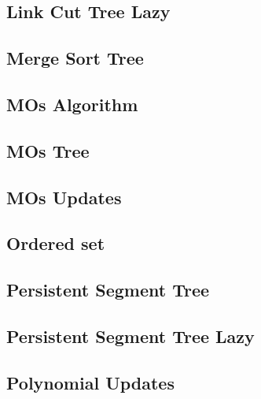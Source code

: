 \subsection{Link Cut Tree Lazy}
\raggedbottom
\hrulefill
\subsection{Merge Sort Tree}
\raggedbottom
\hrulefill
\subsection{MOs Algorithm}
\raggedbottom
\hrulefill
\subsection{MOs Tree}
\raggedbottom
\hrulefill
\subsection{MOs Updates}
\raggedbottom
\hrulefill
\subsection{Ordered set}
\raggedbottom
\hrulefill
\subsection{Persistent Segment Tree}
\raggedbottom
\hrulefill
\subsection{Persistent Segment Tree Lazy}
\raggedbottom
\hrulefill
\subsection{Polynomial Updates}
\raggedbottom
\hrulefill
